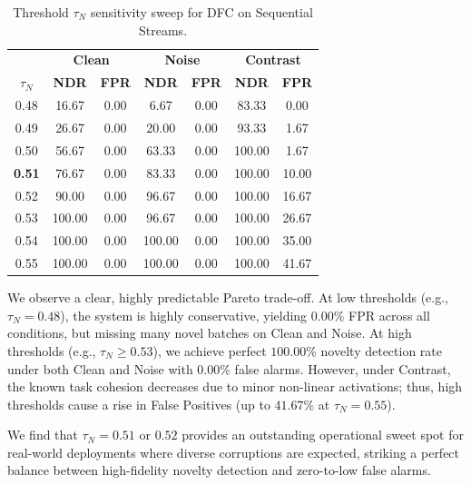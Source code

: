 \documentclass{article}
\theoremstyle{plain}
\theoremstyle{definition}
\theoremstyle{remark}
\begin{document}
\begin{table}[htbp]
\caption{Threshold $\tau_N$ sensitivity sweep for DFC on Sequential Streams.}
\label{tab:sensitivity}
\vskip 0.1in
\begin{center}
\begin{small}
\begin{tabular}{c|cc|cc|cc}
\toprule
& \multicolumn{2}{c|}{\textbf{Clean}} & \multicolumn{2}{c|}{\textbf{Noise}} & \multicolumn{2}{c}{\textbf{Contrast}} \\
$\tau_N$ & \textbf{NDR} & \textbf{FPR} & \textbf{NDR} & \textbf{FPR} & \textbf{NDR} & \textbf{FPR} \\
\midrule
0.48 & 16.67 & 0.00 & 6.67 & 0.00 & 83.33 & 0.00 \\
0.49 & 26.67 & 0.00 & 20.00 & 0.00 & 93.33 & 1.67 \\
0.50 & 56.67 & 0.00 & 63.33 & 0.00 & 100.00 & 1.67 \\
\textbf{0.51} & 76.67 & 0.00 & 83.33 & 0.00 & 100.00 & 10.00 \\
0.52 & 90.00 & 0.00 & 96.67 & 0.00 & 100.00 & 16.67 \\
0.53 & 100.00 & 0.00 & 96.67 & 0.00 & 100.00 & 26.67 \\
0.54 & 100.00 & 0.00 & 100.00 & 0.00 & 100.00 & 35.00 \\
0.55 & 100.00 & 0.00 & 100.00 & 0.00 & 100.00 & 41.67 \\
\bottomrule
\end{tabular}
\end{small}
\end{center}
\vskip -0.1in
\end{table}

We observe a clear, highly predictable Pareto trade-off. At low thresholds (e.g., $\tau_N = 0.48$), the system is highly conservative, yielding $0.00\%$ FPR across all conditions, but missing many novel batches on Clean and Noise. At high thresholds (e.g., $\tau_N \ge 0.53$), we achieve perfect $100.00\%$ novelty detection rate under both Clean and Noise with $0.00\%$ false alarms. However, under Contrast, the known task cohesion decreases due to minor non-linear activations; thus, high thresholds cause a rise in False Positives (up to $41.67\%$ at $\tau_N = 0.55$). 

We find that $\tau_N = 0.51$ or $0.52$ provides an outstanding operational sweet spot for real-world deployments where diverse corruptions are expected, striking a perfect balance between high-fidelity novelty detection and zero-to-low false alarms.
\end{document}
